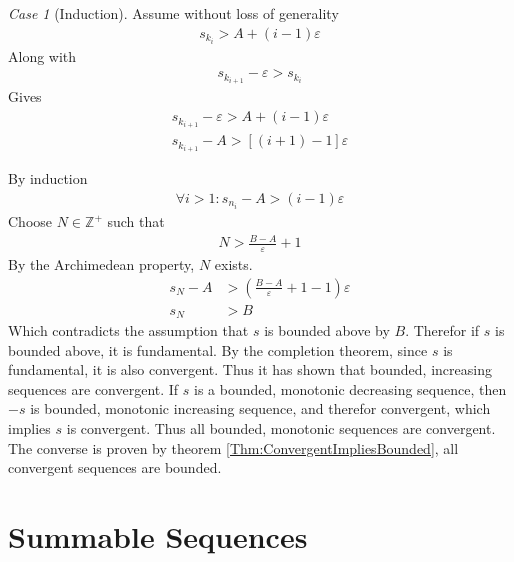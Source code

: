 \documentclass{amsart}
\numberwithin{equation}{section}
\let\oldendproof\endproof
\renewenvironment{proof}[1][\proofname]{%
  \setcounter{case}{0}
  \setcounter{step}{0}
  \oldproof[#1]%
}{\oldendproof}
\theoremstyle{plain}
\newtheorem{theorem}{Theorem}[section]
\theoremstyle{definition}
\theoremstyle{remark}
\newtheorem{case}{Case}
\begin{document}
\begin{proof}
  \begin{case}[Induction]
    Assume without loss of generality
    \begin{align}
      s_{k_i} >A + (i-1) \varepsilon
    \end{align}
    Along with
    \begin{align}
      s_{k_{i+1}} - \varepsilon > s_{k_i}
    \end{align}
    Gives
    \begin{align}
      s_{k_{i+1}} - \varepsilon > A+ (i-1) \varepsilon\\
      s_{k_{i+1}} - A > [(i+1)-1] \varepsilon
    \end{align}
  \end{case}
  By induction 
  \begin{align}
    \forall i>1: s_{n_i} - A > (i-1) \varepsilon
  \end{align}
  Choose $N\in\mathbb{Z}^+$ such that
  \begin{align}
    N > \frac{B-A}{\varepsilon} +1
  \end{align}
  By the Archimedean property, $N$ exists.
  \begin{align}
    s_N - A &> \left(\frac{B-A}{\varepsilon} +1 - 1\right) \varepsilon\\
    s_N &> B
  \end{align}
  Which contradicts the assumption that $s$ is bounded above by $B$.
  Therefor if $s$ is bounded above, it is fundamental.
  By the completion theorem, since $s$ is fundamental, it is also convergent.
  Thus it has shown that bounded, increasing sequences are convergent.
  If $s$ is a bounded, monotonic decreasing sequence, then $-s$ is bounded, monotonic increasing sequence, and therefor convergent, which implies $s$ is convergent.
  Thus all bounded, monotonic sequences are convergent.
  The converse is proven by theorem \ref{Thm:ConvergentImpliesBounded}, all convergent sequences are bounded.
\end{proof}



\section{Summable Sequences}
\end{document}
